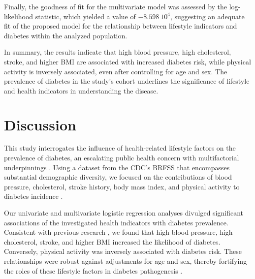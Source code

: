 \documentclass[11pt]{article}
\begin{document}
% 
% 
% 
% 
% 
% 

Finally, the goodness of fit for the multivariate model was assessed by the log-likelihood statistic, which yielded a value of \hyperlink{R1a}{$-8.598\ 10^{4}$}, suggesting an adequate fit of the proposed model for the relationship between lifestyle indicators and diabetes within the analyzed population.

In summary, the results indicate that high blood pressure, high cholesterol, stroke, and higher BMI are associated with increased diabetes risk, while physical activity is inversely associated, even after controlling for age and sex. The prevalence of diabetes in the study's cohort underlines the significance of lifestyle and health indicators in understanding the disease.

\section*{Discussion}

This study interrogates the influence of health-related lifestyle factors on the prevalence of diabetes, an escalating public health concern with multifactorial underpinnings \cite{Lam2012TheWD, Singh2013TheAQ}. Using a dataset from the CDC's BRFSS that encompasses substantial demographic diversity, we focused on the contributions of blood pressure, cholesterol, stroke history, body mass index, and physical activity to diabetes incidence \cite{Wang2021TrendsIP, Bi2012AdvancedRO}.

Our univariate and multivariate logistic regression analyses divulged significant associations of the investigated health indicators with diabetes prevalence. Consistent with previous research \cite{Ng2019SmokingDD, Bays2007TheRO}, we found that high blood pressure, high cholesterol, stroke, and higher BMI increased the likelihood of diabetes. Conversely, physical activity was inversely associated with diabetes risk. These relationships were robust against adjustments for age and sex, thereby fortifying the roles of these lifestyle factors in diabetes pathogenesis \cite{Kodama2013AssociationBP, Hjerkind2017AdiposityPA}.
\end{document}
